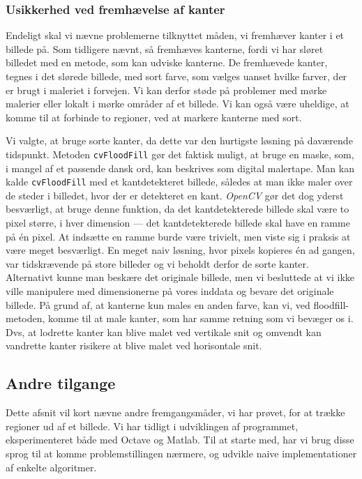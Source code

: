 {\subsubsection{Usikkerhed ved fremhævelse af kanter}
Endeligt skal vi nævne problemerne tilknyttet måden, vi fremhæver kanter
i et billede på. Som tidligere nævnt, så fremhæves kanterne, fordi vi
har sløret billedet med en metode, som kan udviske kanterne. De
fremhævede kanter, tegnes i det slørede billede, med sort farve, som
vælges uanset hvilke farver, der er brugt i maleriet i forvejen. Vi kan
derfor støde på problemer med mørke malerier eller lokalt i mørke
områder af et billede. Vi kan også være uheldige, at komme til at
forbinde to regioner, ved at markere kanterne med sort.

Vi valgte, at bruge sorte kanter, da dette var den hurtigste løsning på
daværende tidspunkt. Metoden \texttt{cvFloodFill} gør det faktisk
muligt, at bruge en maske, som, i mangel af et passende dansk ord, kan
beskrives som digital malertape. Man kan kalde \texttt{cvFloodFill} med
et kantdetekteret billede, således at man ikke maler over de steder i
billedet, hvor der er detekteret en kant. \emph{OpenCV} gør det dog
yderst besværligt, at bruge denne funktion, da det kantdetekterede
billede skal være to pixel større, i hver dimension --- det
kantdetekterede billede skal have en ramme på én pixel. At indsætte en
ramme burde være trivielt, men viste sig i praksis at være meget
besværligt. En meget naiv løsning, hvor pixels kopieres én ad gangen,
var tidskrævende på store billeder og vi beholdt derfor de sorte kanter.
Alternativt kunne man beskære det originale billede, men vi besluttede
at vi ikke ville manipulere med dimensionerne på vores inddata og bevare
det originale billede. På grund af, at kanterne kun males en anden
farve, kan vi, ved floodfill-metoden, komme til at male kanter, som har
samme retning som vi bevæger os i. Dvs, at lodrette kanter kan blive
malet ved vertikale snit og omvendt kan vandrette kanter risikere at
blive malet ved horisontale snit.

\subsection{Andre tilgange}
Dette afsnit vil kort nævne andre fremgangsmåder, vi har prøvet, for at
trække regioner ud af et billede. Vi har tidligt i udviklingen af
programmet, eksperimenteret både med Octave og Matlab. Til at starte
med, har vi brug disse sprog til at komme problemstillingen nærmere,
og udvikle naive implementationer af enkelte algoritmer.

}
